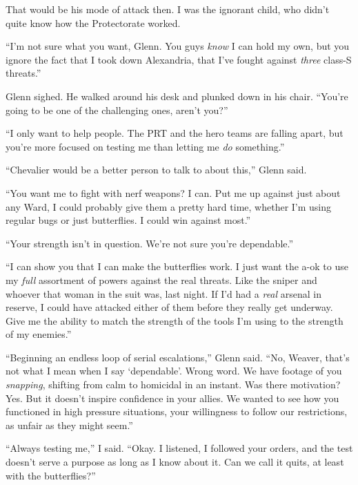 That would be his mode of attack then.  I was the ignorant child, who didn't quite know how the Protectorate worked.



``I'm not sure what you want, Glenn.  You guys \emph{know }I can hold my own, but you ignore the fact that I took down Alexandria, that I've fought against \emph{three} class-S threats.''



Glenn sighed.  He walked around his desk and plunked down in his chair.  ``You're going to be one of the challenging ones, aren't you?''



``I only want to help people.  The PRT and the hero teams are falling apart, but you're more focused on testing me than letting me \emph{do} something.''



``Chevalier would be a better person to talk to about this,'' Glenn said.



``You want me to fight with nerf weapons?  I can.  Put me up against just about any Ward, I could probably give them a pretty hard time, whether I'm using regular bugs or just butterflies.  I could win against most.''



``Your strength isn't in question.  We're not sure you're dependable.''



``I can show you that I can make the butterflies work.  I just want the a-ok to use my \emph{full} assortment of powers against the real threats.  Like the sniper and whoever that woman in the suit was, last night.  If I'd had a \emph{rea}\emph{l }arsenal in reserve, I could have attacked either of them before they really get underway.  Give me the ability to match the strength of the tools I'm using to the strength of my enemies.''



``Beginning an endless loop of serial escalations,'' Glenn said.  ``No, Weaver, that's not what I mean when I say `dependable'.  Wrong word.  We have footage of you \emph{snapping}, shifting from calm to homicidal in an instant.  Was there motivation?  Yes.  But it doesn't inspire confidence in your allies.  We wanted to see how you functioned in high pressure situations, your willingness to follow our restrictions, as unfair as they might seem.''



``Always testing me,'' I said.  ``Okay.  I listened, I followed your orders, and the test doesn't serve a purpose as long as I know about it.  Can we call it quits, at least with the butterflies?''



